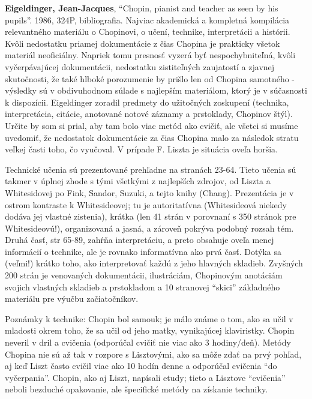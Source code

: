 \documentclass[11pt,a4paper]{book}
\begin{document}
\textbf{\hypertarget{r:eigeldinger}{Eigeldinger, Jean-Jacques}}, “Chopin, pianist and teacher as seen by his pupils”. 1986, 324P, bibliografia. Najviac akademická a kompletná kompilácia relevantného materiálu o Chopinovi, o učení, technike, interpretácii a histórii. Kvôli nedostatku priamej dokumentácie z čias Chopina je prakticky všetok materiál neoficiálny. Napriek tomu presnosť vyzerá byť nespochybniteľná, kvôli vyčerpávajúcej dokumentácii, nedostatku zistiteľných zaujatostí a zjavnej skutočnosti, že také hlboké porozumenie by prišlo len od Chopina samotného - výsledky sú v obdivuhodnom súlade s najlepším materiálom, ktorý je v súčasnosti k dispozícii. Eigeldinger zoradil predmety do užitočných zoskupení (technika, interpretácia, citácie, anotované notové záznamy a prstoklady, Chopinov štýl). Určite by som si prial, aby tam bolo viac metód ako cvičiť, ale všetci si musíme uvedomiť, že nedostatok dokumentácie za čias Chopina malo za následok stratu veľkej časti toho, čo vyučoval. V prípade F. Liszta je situácia oveľa horšia. 

Technické učenia sú prezentované prehľadne na stranách 23-64. Tieto učenia sú takmer v úplnej zhode s tými všetkými z najlepších zdrojov, od Liszta a Whitesidovej po Fink, Sandor, Suzuki, a tejto knihy (Chang). Prezentácia je v ostrom kontraste k Whitesideovej; tu je autoritatívna (Whitesideová niekedy dodáva jej vlastné zistenia), krátka (len 41 strán v porovnaní s 350 stránok pre Whitesideovú!), organizovaná a jasná, a zároveň pokrýva podobný rozsah tém. Druhá časť, str 65-89, zahŕňa interpretáciu, a preto obsahuje oveľa menej informácií o technike, ale je rovnako informatívna ako prvá časť. Dotýka sa (veľmi!) krátko toho, ako interpretovať každú z jeho hlavných skladieb. Zvyšných 200 strán je venovaných dokumentácii, ilustráciám, Chopinovým anotáciám svojich vlastných skladieb a prstokladom a 10 stranovej “skici” základného materiálu pre výučbu začiatočníkov. 

Poznámky k technike: Chopin bol samouk; je málo známe o tom, ako sa učil v mladosti okrem toho, že sa učil od jeho matky, vynikajúcej klaviristky. Chopin neveril v dril a cvičenia (odporúčal cvičiť nie viac ako 3 hodiny/deň). Metódy Chopina nie sú až tak v rozpore s Lisztovými, ako sa môže zdať na prvý pohľad, aj keď Liszt často cvičil viac ako 10 hodín denne a odporúčal cvičenia “do vyčerpania”. Chopin, ako aj Liszt, napísali etudy; tieto a Lisztove “cvičenia” neboli bezduché opakovanie, ale špecifické metódy na získanie techniky. 
\end{document}
